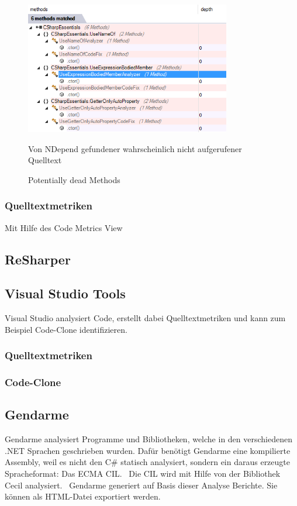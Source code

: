 \begin{figure}[ht]
\centering
\includegraphics[width=0.8\textwidth]{images/dead-methods.png}
\caption{Potentially dead Methods}
\vspace{0.1cm}
Von NDepend gefundener wahrscheinlich nicht aufgerufener Quelltext
\label{fig:dead-methods}
\end{figure}

\subsubsection{Quelltextmetriken}
Mit Hilfe des Code Metrics View 


\subsection{ReSharper}


\subsection{Visual Studio Tools}
Visual Studio analysiert Code, erstellt dabei Quelltextmetriken und kann zum Beispiel Code-Clone identifizieren.

\subsubsection{Quelltextmetriken}

\subsubsection{Code-Clone}


\subsection{Gendarme}
Gendarme analysiert Programme und Bibliotheken, welche in den verschiedenen .NET Sprachen geschrieben wurden. Dafür benötigt Gendarme eine kompilierte Assembly, weil es nicht den C\# statisch analysiert, sondern ein daraus erzeugte Spracheformat: Das ECMA CIL.~\cite{ecma} Die CIL wird mit Hilfe von der Bibliothek Cecil analysiert.~\cite{cecil} Gendarme generiert auf Basis dieser Analyse Berichte. Sie können als HTML-Datei exportiert werden.

